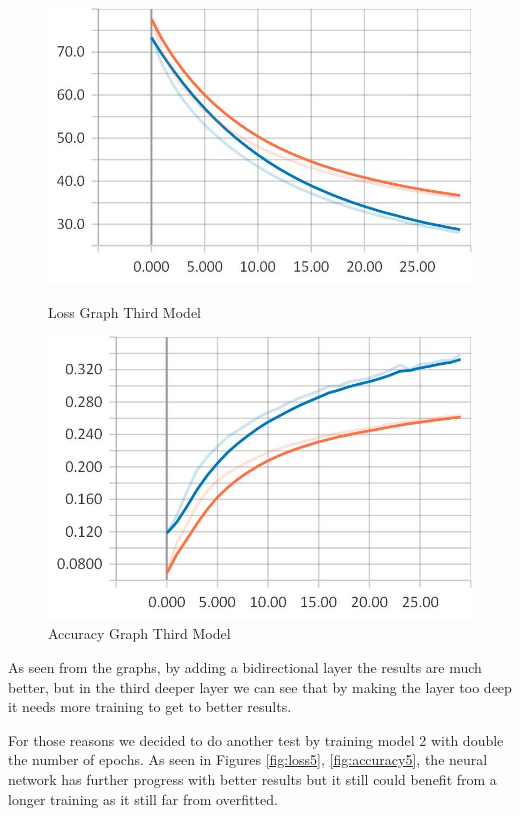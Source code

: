 \begin{figure}
\centering
\begin{minipage}{.5\textwidth}
	\centering
	\includegraphics[width=1\linewidth]{Illustrations/losss4.jpg}
	\caption{Loss Graph Third Model}
	\label{fig:loss4}
\end{minipage}%
\begin{minipage}{.5\textwidth}
	\centering
	\includegraphics[width=1\linewidth]{Illustrations/accuracy4.jpg}
	\caption{Accuracy Graph Third Model}
	\label{fig:accuracy4}
\end{minipage}
\end{figure}

\newpage
As seen from the graphs, by adding a bidirectional layer the results are much better,
but in the third deeper layer we can see that by making the layer too deep it needs 
more training to get to better results.

For those reasons we decided to do another test by training model 2 with double the 
number of epochs. As seen in Figures \ref{fig:loss5}, \ref{fig:accuracy5}, the neural network has further progress with 
better results but it still could benefit from a longer training as it still far from overfitted.

